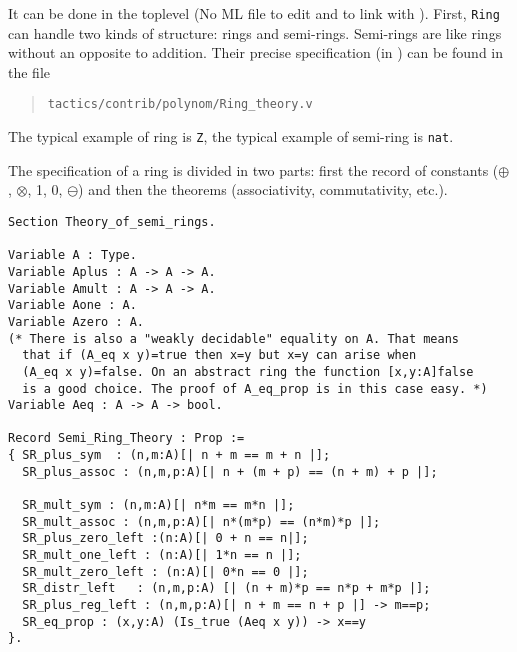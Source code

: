 
It can be done in the \Coq toplevel (No ML file to edit and to link
with \Coq). First, \texttt{Ring} can handle two kinds of structure:
rings and semi-rings. Semi-rings are like rings without an opposite to
addition. Their precise specification (in \gallina) can be found in
the file

\begin{quotation}
\begin{verbatim}
tactics/contrib/polynom/Ring_theory.v
\end{verbatim}
\end{quotation}

The typical example of ring is \texttt{Z}, the typical
example of semi-ring is \texttt{nat}.

The specification of a
ring is divided in two parts: first the record of constants
($\oplus$, $\otimes$, 1, 0, $\ominus$) and then the theorems
(associativity, commutativity, etc.).

\begin{small}
\begin{flushleft}
\begin{verbatim}
Section Theory_of_semi_rings.

Variable A : Type.
Variable Aplus : A -> A -> A.
Variable Amult : A -> A -> A.
Variable Aone : A.
Variable Azero : A.
(* There is also a "weakly decidable" equality on A. That means 
  that if (A_eq x y)=true then x=y but x=y can arise when 
  (A_eq x y)=false. On an abstract ring the function [x,y:A]false
  is a good choice. The proof of A_eq_prop is in this case easy. *)
Variable Aeq : A -> A -> bool.

Record Semi_Ring_Theory : Prop :=
{ SR_plus_sym  : (n,m:A)[| n + m == m + n |];
  SR_plus_assoc : (n,m,p:A)[| n + (m + p) == (n + m) + p |];

  SR_mult_sym : (n,m:A)[| n*m == m*n |];
  SR_mult_assoc : (n,m,p:A)[| n*(m*p) == (n*m)*p |];
  SR_plus_zero_left :(n:A)[| 0 + n == n|];
  SR_mult_one_left : (n:A)[| 1*n == n |];
  SR_mult_zero_left : (n:A)[| 0*n == 0 |];
  SR_distr_left   : (n,m,p:A) [| (n + m)*p == n*p + m*p |];
  SR_plus_reg_left : (n,m,p:A)[| n + m == n + p |] -> m==p;
  SR_eq_prop : (x,y:A) (Is_true (Aeq x y)) -> x==y
}.
\end{verbatim}
\end{flushleft}
\end{small}


